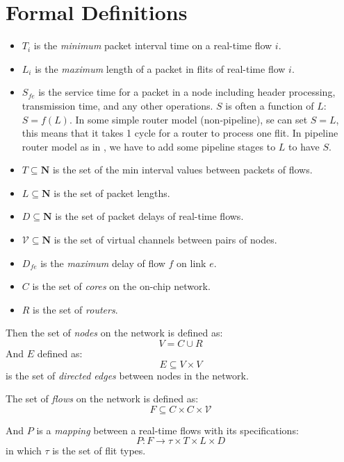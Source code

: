 \documentclass[10pt]{article}
\begin{document}
\section{Formal Definitions}
\begin{itemize}
\item $T_i$ is the {\em minimum} packet interval time on a real-time flow $i$.
\item $L_i$ is the {\em maximum} length of a packet in flits of real-time flow $i$.
\item $S_{fe}$ is the service time for a packet in a node including header 
processing, transmission time, and any other operations. $S$ is often a 
function of $L$: $S=f(L)$. In some simple router model (non-pipeline), se can set $S=L$, this means that
it takes 1 cycle for a router to process one flit. In pipeline router model as 
in \cite{PehDelayModel, PehSpecPipeR}, we have to add some pipeline 
stages to $L$ to have $S$. 
\item $T \subseteq \mathbf{N}$ is the set of the min interval values between packets of flows. 
\item $L \subseteq \mathbf{N}$ is the set of packet lengths.
\item $D \subseteq \mathbf{N}$ is the set of packet delays of real-time flows.
\item $\mathcal{V} \subseteq \mathbf{N}$ is the set of virtual channels between pairs of nodes. 
\item $D_{fe}$ is the {\em maximum} delay of flow $f$ on link $e$.
\item $C$ is the set of {\em cores} on the on-chip network.
\item $R$ is the set of {\em routers}.
\end{itemize}

Then the set of {\em nodes} on the network is defined as:
\begin{equation}\label{reio}
V = C \cup R
\end{equation}
And $E$ defined as:
\begin{equation}
E \subseteq V \times V 
\end{equation}
is the set of {\em directed edges} between nodes in the network.

The set of {\em flows} on the network is defined as:
\begin{equation}
F \subseteq C \times C \times \mathcal{V} 
\end{equation}

And $P$ is a {\em mapping } between a real-time flows with its specifications:
\begin{equation}
P:F \rightarrow \tau \times T \times L \times D
\end{equation}
in which $\tau$ is the set of flit types.
\end{document}
